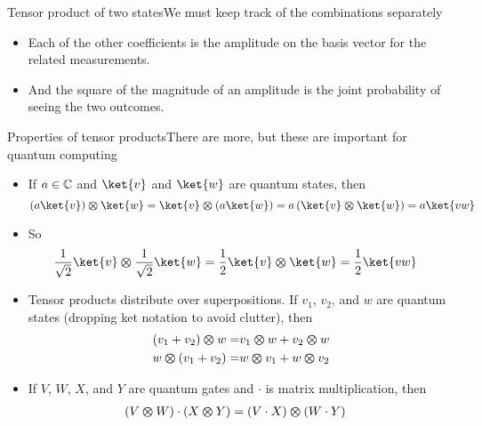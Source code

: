 \begin{frame}{Tensor product of two states}{We must keep track of the combinations separately}
{{\begin{itemize}
    \item Each of the other coefficients is the amplitude on the basis vector for the related measurements.
    \item And the square of the magnitude of an amplitude is the joint probability of seeing the two outcomes.
\end{itemize}
}
}{%
}
\end{frame}

\begin{frame}{Properties of tensor products}{There are more, but these are important for quantum computing}
\Vskip{-3.5em}\begin{itemize}[<+->]
    \item If $a \in \mathbb{C}$ and $\ket{v}$ and $\ket{w}$ are quantum states, then
    \[ 
       \TensProd{(a\ket{v})}{\ket{w}} = \TensProd{\ket{v}}{(a\ket{w})} = a\,(\TensProd{\ket{v}}{\ket{w}}) = a\ket{vw}
    \]
    \item So
    \Vskip{-3em}\begin{align*}
        \TensProd{\RootTwo{\ket{v}}}{\RootTwo\ket{w}} &= \frac{1}{2}\TensProd{\ket{v}}{\ket{w}} = \frac{1}{2} \ket{vw}
    \end{align*}
    \item Tensor products distribute over superpositions.  If $v_{1}$, $v_{2}$, and $w$ are quantum states (dropping ket notation to avoid clutter), then
    \begin{align*}
       (v_{1}+v_{2}) \bm{\otimes}{} w = & v_{1} \bm{\otimes}{} w + v_{2} \bm{\otimes}{} w\\
       w \bm{\otimes}{} (v_{1}+v_{2}) = & w \bm{\otimes}{} v_{1} + w \bm{\otimes}{} v_{2} 
    \end{align*}
    \item If $V$, $W$, $X$, and $Y$ are quantum gates and $\cdot$ is matrix multiplication, then
\begin{align*}
    (V \bm{\otimes}{} W) \cdot (X \bm{\otimes}{} Y) &= (V\cdot X) \bm{\otimes}{} (W\cdot Y)
\end{align*}
\end{itemize}
\end{frame}


